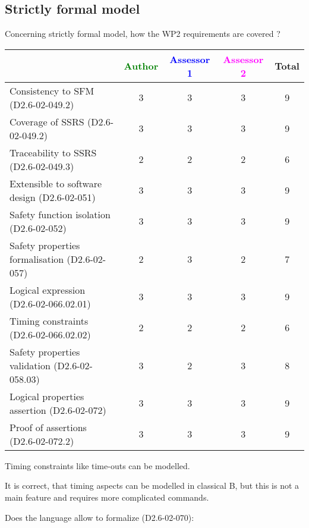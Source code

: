 \subsection{Strictly formal model}

Concerning strictly formal model, how the WP2 requirements are covered ?

\begin{tabular}{|l | c | c | c | c|}
\hline
& \textcolor{green}{Author} & \textcolor{blue}{Assessor 1} & \textcolor{magenta}{Assessor 2} & Total \\
\hline 
Consistency to SFM (D2.6-02-049.2) & 3 & 3 & 3 & 9 \\
\hline
Coverage of SSRS (D2.6-02-049.2)  & 3 & 3 & 3 & 9 \\
\hline
Traceability to  SSRS (D2.6-02-049.3)  & 2 & 2 & 2 & 6 \\
\hline
Extensible to software design (D2.6-02-051)  & 3 & 3 & 3 & 9 \\
\hline
Safety function isolation (D2.6-02-052)  & 3 & 3 & 3 & 9 \\
\hline 
Safety properties formalisation (D2.6-02-057)  & 2 & 3 & 2 & 7 \\
\hline
Logical expression (D2.6-02-066.02.01)  & 3 & 3 & 3 & 9 \\
\hline
Timing constraints (D2.6-02-066.02.02)  & 2 & 2 & 2 & 6 \\
\hline
Safety properties validation (D2.6-02-058.03)  & 3 & 2 & 3 & 8 \\
\hline
Logical properties assertion (D2.6-02-072)  & 3 & 3 & 3 & 9 \\
\hline
Proof of assertions (D2.6-02-072.2)  & 3 & 3 & 3 & 9 \\
\hline
\end{tabular}



\begin{author_comment}
Timing constraints like time-outs can be modelled.
\end{author_comment}


\begin{assessor2}
It is correct, that timing aspects can be modelled in classical B, but this is not a main feature and requires more complicated commands.
\end{assessor2}

Does the language allow to  formalize (D2.6-02-070):

